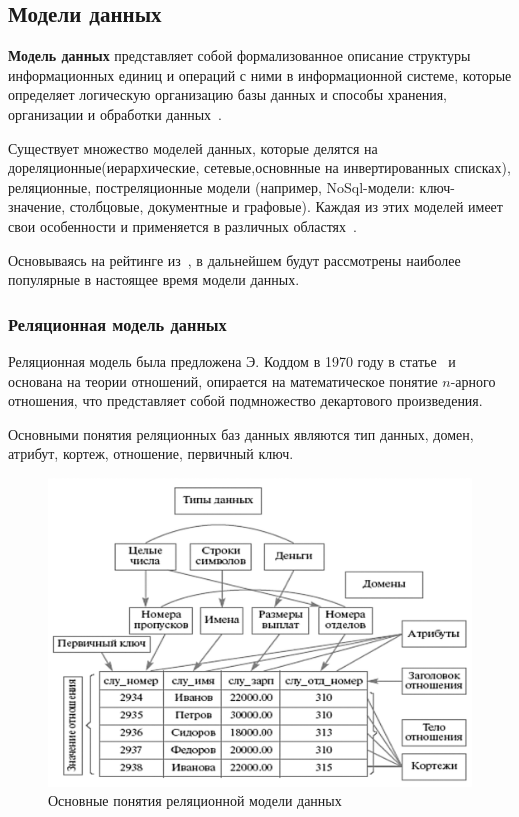 \subsection{Модели данных}

\textbf{Модель данных} представляет собой формализованное описание структуры информационных единиц и операций с ними в информационной системе, которые определяет логическую организацию базы данных и способы хранения, организации и обработки данных~\cite[с. 4]{Avrunyev2018}.

Существует множество моделей данных, которые делятся на дореляционные(иерархические, сетевые,основнные на инвертированных списках), реляционные, постреляционные модели (например, NoSql-модели: ключ-значение, столбцовые, документные и графовые). Каждая из этих моделей имеет свои особенности и применяется в различных областях~\cite{Avrunyev2018}.

Основываясь на рейтинге из~\cite{DBEnginesRanking}, в дальнейшем будут рассмотрены наиболее популярные в настоящее время модели данных.

\subsubsection{Реляционная модель данных}

Реляционная модель была предложена Э. Коддом в 1970 году в статье~\cite{Kodd1970} и основана на теории отношений, опирается на математическое понятие $n$-арного отношения, что представляет собой подмножество декартового произведения.

Основными понятия реляционных баз данных являются тип данных, домен, атрибут, кортеж, отношение, первичный ключ.

\begin{figure}[ht!]
	\begin{center}
		\includegraphics[scale=0.7]{./img/rel-model.png}
	\end{center}
	\caption{Основные понятия реляционной модели данных~\cite[c. 31]{Avrunyev2018}}
	\label{fig:rel-model}
\end{figure}

